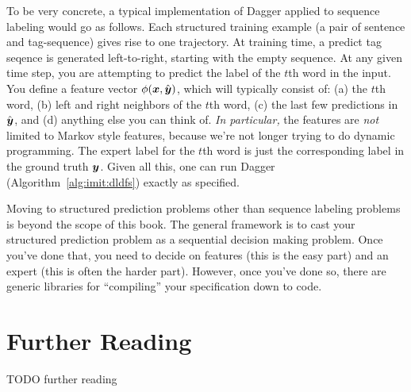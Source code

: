 To be very concrete, a typical implementation of Dagger applied to sequence labeling would go as follows.
Each structured training example (a pair of sentence and tag-sequence) gives rise to one trajectory.
At training time, a predict tag seqence is generated left-to-right, starting with the empty sequence.
At any given time step, you are attempting to predict the label of the $t$th word in the input.
You define a feature vector $\phi({\boldsymbol{x}},\hat{{\boldsymbol{y}}})$, which will typically consist of: (a) the $t$th word, (b) left and right neighbors of the $t$th word, (c) the last few predictions in $\hat{{\boldsymbol{y}}}$, and (d) anything else you can think of.
\emph{In particular,} the features are \emph{not} limited to Markov style features, because we're not longer trying to do dynamic programming.
The expert label for the $t$th word is just the corresponding label in the ground truth ${\boldsymbol{y}}$.
Given all this, one can run Dagger (Algorithm~\ref{alg:imit:dldfs}) exactly as specified.

Moving to structured prediction problems other than sequence labeling problems is beyond the scope of this book.
The general framework is to cast your structured prediction problem as a sequential decision making problem.
Once you've done that, you need to decide on features (this is the easy part) and an expert (this is often the harder part).
However, once you've done so, there are generic libraries for ``compiling'' your specification down to code.

\section{Further Reading}

TODO further reading


